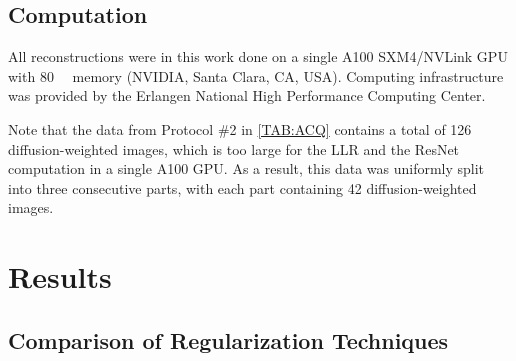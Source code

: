 \documentclass[journal,twoside,web]{ieeecolor}
\newcommand{\argmin}{\operatornamewithlimits{argmin}}
\newcommand{\norm}[1]{\left\lVert#1\right\rVert}
\begin{document}

	\subsection{Computation}

	All reconstructions were in this work done on a single A100 SXM4/NVLink GPU
	with \SI{80}{\giga\byte} memory (NVIDIA, Santa Clara, CA, USA).
	Computing infrastructure was provided by
	the Erlangen National High Performance Computing Center.

	Note that the data from Protocol \#2 in \cref{TAB:ACQ} contains a total of
	126 diffusion-weighted images, which is too large for the LLR and the ResNet computation
	in a single A100 GPU. As a result, this data was uniformly
	split into three consecutive parts,
	with each part containing 42 diffusion-weighted images.

	\section{Results}

	\subsection{Comparison of Regularization Techniques}
\end{document}
